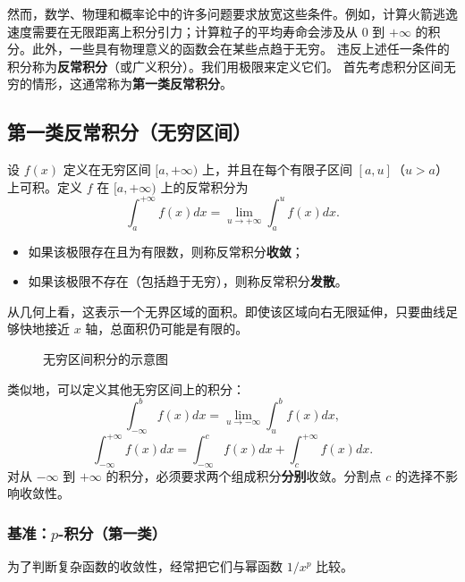 然而，数学、物理和概率论中的许多问题要求放宽这些条件。例如，计算火箭逃逸速度需要在无限距离上积分引力；计算粒子的平均寿命会涉及从 $0$ 到 $+\infty$ 的积分。此外，一些具有物理意义的函数会在某些点趋于无穷。
违反上述任一条件的积分称为\textbf{反常积分}（或广义积分）。我们用极限来定义它们。
首先考虑积分区间无穷的情形，这通常称为\textbf{第一类反常积分}。

\subsection{第一类反常积分（无穷区间）}

\begin{definition}
设 $f(x)$ 定义在无穷区间 $[a,+\infty)$ 上，并且在每个有限子区间 $[a,u]$（$u>a$）上可积。定义 $f$ 在 $[a,+\infty)$ 上的反常积分为
\[
\int_a^{+\infty}f(x)dx=\lim_{u\to +\infty}\int_a^u f(x)dx.
\]
\begin{itemize}
    \item 如果该极限存在且为有限数，则称反常积分\textbf{收敛}；
    \item 如果该极限不存在（包括趋于无穷），则称反常积分\textbf{发散}。
\end{itemize}
\end{definition}
从几何上看，这表示一个无界区域的面积。即使该区域向右无限延伸，只要曲线足够快地接近 $x$ 轴，总面积仍可能是有限的。

\begin{figure}[htbp]
\centering
{}
\caption{无穷区间积分的示意图}
\end{figure}

类似地，可以定义其他无穷区间上的积分：
\[
\int_{-\infty}^{b}f(x)dx=\lim_{u\to -\infty}\int_u^b f(x)dx,
\]
\[
\int_{-\infty}^{+\infty}f(x)dx=\int_{-\infty}^{c}f(x)dx+\int_c^{+\infty}f(x)dx.
\]
对从 $-\infty$ 到 $+\infty$ 的积分，必须要求两个组成积分\textbf{分别}收敛。分割点 $c$ 的选择不影响收敛性。

\subsubsection{基准：$p$-积分（第一类）}
为了判断复杂函数的收敛性，经常把它们与幂函数 $1/x^p$ 比较。

